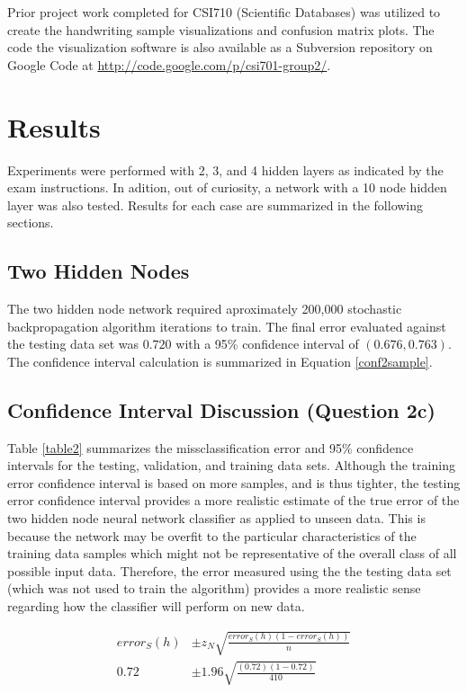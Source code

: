 \documentclass{article}
\begin{document}
Prior project work completed for CSI710 (Scientific Databases) was utilized to create the handwriting sample visualizations and confusion matrix plots. The code the visualization software is also available as a Subversion repository on Google Code at \url{http://code.google.com/p/csi701-group2/}.

\section{Results}\label{Results}

Experiments were performed with 2, 3, and 4 hidden layers as indicated by the exam instructions. In adition, out of curiosity, a network with a 10 node hidden layer was also tested. Results for each case are summarized in the following sections.

\subsection{Two Hidden Nodes}\label{hidden2}

The two hidden node network required aproximately 200,000 stochastic backpropagation algorithm iterations to train. The final error evaluated against the testing data set was \(0.720\) with a 95\% confidence interval of \((0.676 , 0.763)\). The confidence interval calculation is summarized in Equation \ref{conf2sample}.

\subsection{Confidence Interval Discussion (Question 2c)}\label{hidden2}

Table \ref{table2} summarizes the missclassification error and 95\% confidence intervals for the testing, validation, and training data sets. Although the training error confidence interval is based on more samples, and is thus tighter, the testing error confidence interval provides a more realistic estimate of the true error of the two hidden node neural network classifier as applied to unseen data. This is because the network may be overfit to the particular characteristics of the training data samples which might not be representative of the overall class of all possible input data. Therefore, the error measured using the the testing data set (which was not used to train the algorithm) provides a more realistic sense regarding how the classifier will perform on new data. 

\begin{equation}\label{conf2sample}
\begin{split}
error_{S}(h) &\pm z_{N}\sqrt{\frac{error_{S}(h)(1-error_{S}(h))}{n}} \\
0.72 &\pm 1.96\sqrt{\frac{(0.72)(1-0.72)}{410}} 
\end{split}
\end{equation}
\end{document}
